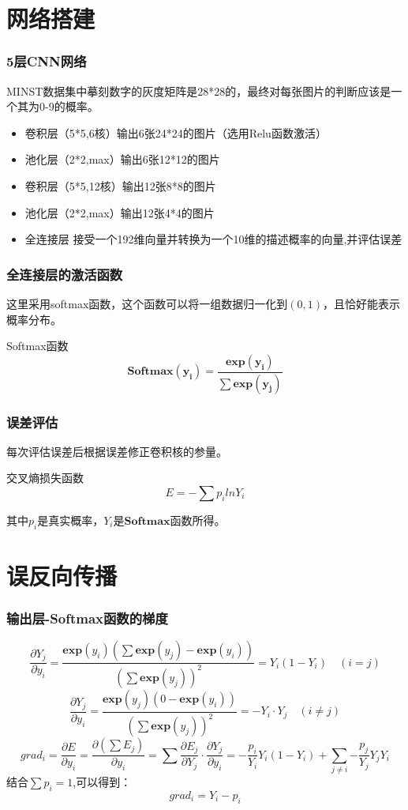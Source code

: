 \documentclass[
aspectratio=169,  %
]{ctexbeamer}
\begin{document}
	\section{网络搭建}
	\begin{frame}
		\frametitle{5层CNN网络}
		MINST数据集中摹刻数字的灰度矩阵是28*28的，最终对每张图片的判断应该是一个其为0-9的概率。
		\begin{itemize}
			\item 卷积层（5*5,6核）输出6张24*24的图片（选用Relu函数激活）
			\item 池化层（2*2,max）输出6张12*12的图片
			\item 卷积层（5*5,12核）输出12张8*8的图片
			\item 池化层（2*2,max）输出12张4*4的图片
			\item 全连接层 接受一个192维向量并转换为一个10维的描述概率的向量,并评估误差
		\end{itemize}
	\end{frame}
	\begin{frame}
		\frametitle{全连接层的激活函数}
		这里采用softmax函数，这个函数可以将一组数据归一化到$(0,1)$，且恰好能表示概率分布。
		\begin{block}{Softmax函数}
		$$
		\mathbf{Softmax(y_i)}=\dfrac{\mathbf{exp(y_i)}}{\sum{\mathbf{exp(y_j)}}}
		$$
		\end{block}
		
	\end{frame}
	
	\begin{frame}
		\frametitle{误差评估}
	
		每次评估误差后根据误差修正卷积核的参量。
			\begin{block}{交叉熵损失函数}
				$$
				E=-\sum{p_i}lnY_i
				$$
			\end{block}
		其中$p_i$是真实概率，$Y_i$是$\mathbf{Softmax}$函数所得。
	\end{frame}
	
	\section{误反向传播}
	\begin{frame}
		\frametitle{输出层-Softmax函数的梯度}
		$$
		\dfrac{\partial{Y_j}}{\partial{y_i}}=	\dfrac{\mathbf{exp}(y_i)(\sum{ \mathbf{exp}(y_j)-\mathbf{exp}(y_i)})}{(\sum{\mathbf{exp}(y_j)})^2}=Y_i(1-Y_i)\quad (i=j)
		$$
		$$
		\dfrac{\partial{Y_j}}{\partial{y_i}}=	\dfrac{\mathbf{exp}(y_j)(0-\mathbf{exp}(y_i))}{(\sum{\mathbf{exp}(y_j)})^2}=-Y_i·Y_j \quad(i\neq j)
		$$
		$$
		grad_i=\dfrac{\partial{E}}{\partial{y_i}}=\dfrac{\partial{(\sum{E_j})}}{\partial{y_i}}=\sum{\dfrac{\partial{E_j}}{\partial{Y_j}}\cdot \dfrac{\partial{Y_j}}{\partial{y_i}}}=-\dfrac{p_i}{Y_i}Y_i(1-Y_i)+\sum_{j \neq i}{-\dfrac{p_j}{Y_j}Y_jY_i}
		$$
		结合$\sum p_i =1$,可以得到：
		$$
		grad_i=Y_i-p_i
		$$
	\end{frame}
	
\end{document}
